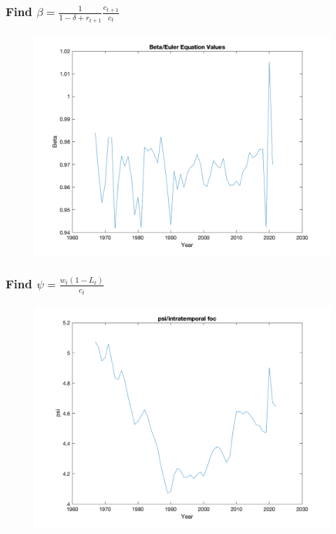 \documentclass{beamer}
\begin{document}
\begin{frame}
\frametitle[alignment=center]{Find $\beta=\frac{1}{1-\delta+r_{t+1}}\frac{c_{t+1}}{c_t}$}
\begin{figure}
\centering
\includegraphics[scale=0.5]{Figures/Figure_5.png}
\end{figure}
\end{frame}

\begin{frame}
\frametitle[alignment=center]{Find $\psi=\frac{w_t(1-L_t)}{c_t}$}
\begin{figure}
\centering
\includegraphics[scale=0.5]{Figures/Figure_6.png}
\end{figure}
\end{frame}
\end{document}
